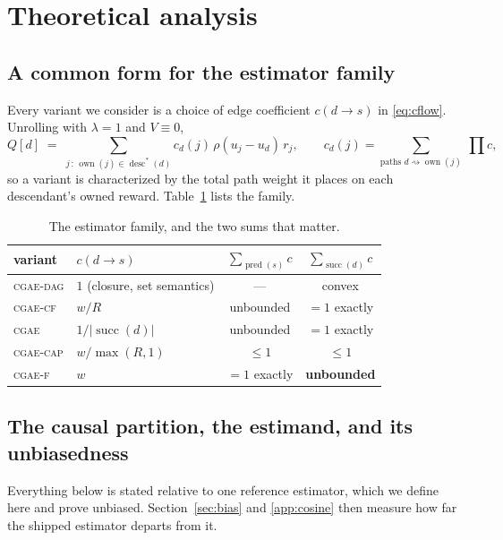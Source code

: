 \documentclass[review,authoryear,3p,times]{elsarticle}
\newcommand{\cgae}{\textsc{cgae}}              %
\newcommand{\cflow}{\textsc{cgae-cf}}          %
\newcommand{\cflowraw}{\textsc{cgae-f}}        %
\newcommand{\cdag}{\textsc{cgae-dag}}          %
\newcommand{\ccap}{\textsc{cgae-cap}}          %
\newcommand{\desc}{\operatorname{desc}}
\newcommand{\pred}{\operatorname{pred}}
\newcommand{\suc}{\operatorname{succ}}
\newcommand{\own}{\operatorname{own}}
\begin{document}
\section{Theoretical analysis}
\label{sec:theory}

\subsection{A common form for the estimator family}

Every variant we consider is a choice of edge coefficient $c(d\!\to\!s)$ in
\eqref{eq:cflow}. Unrolling with $\lambda=1$ and $V\equiv 0$,
\begin{equation}
Q[d] \;=\; \sum_{j\,:\,\own(j)\in\desc^{*}(d)} c_d(j)\,\rho(u_j-u_d)\,r_j,
\qquad
c_d(j)=\!\!\sum_{\text{paths } d\rightsquigarrow \own(j)}\ \prod c ,
\label{eq:unroll}
\end{equation}
so a variant is characterized by the total path weight it places on each
descendant's owned reward. Table~\ref{tab:family} lists the family.

\begin{table}[tbp]
\centering
\caption{The estimator family, and the two sums that matter.}
\label{tab:family}
\begin{tabular}{llcc}
\toprule
variant & $c(d\!\to\!s)$ & $\sum_{\pred(s)} c$ & $\sum_{\suc(d)} c$ \\
\midrule
\cdag  & $1$ (closure, set semantics)      & ---            & convex \\
\cflow & $w/R$                             & unbounded      & $=1$ exactly \\
\cgae  & $1/|\suc(d)|$                     & unbounded      & $=1$ exactly \\
\ccap  & $w/\max(R,1)$                     & $\le 1$        & $\le 1$ \\
\cflowraw & $w$                            & $=1$ exactly   & \textbf{unbounded} \\
\bottomrule
\end{tabular}
\end{table}

\subsection{The causal partition, the estimand, and its unbiasedness}
\label{sec:estimand}

Everything below is stated relative to one reference estimator, which we define
here and prove unbiased. Section~\ref{sec:bias} and \ref{app:cosine}
then measure how far the shipped estimator departs from it.
\end{document}
